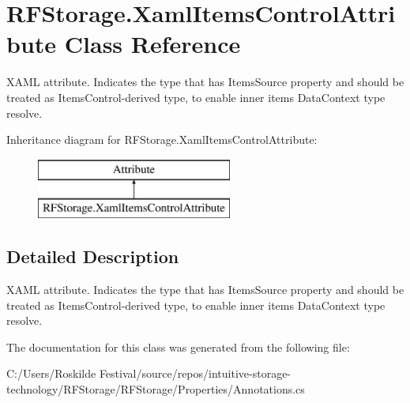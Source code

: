 \section{R\+F\+Storage.\+Xaml\+Items\+Control\+Attribute Class Reference}
\label{class_r_f_storage_1_1_xaml_items_control_attribute}


X\+A\+ML attribute. Indicates the type that has {\ttfamily Items\+Source} property and should be treated as {\ttfamily Items\+Control}-\/derived type, to enable inner items {\ttfamily Data\+Context} type resolve.  


Inheritance diagram for R\+F\+Storage.\+Xaml\+Items\+Control\+Attribute\+:\begin{figure}[H]
\begin{center}
\leavevmode
\includegraphics[height=2.000000cm]{class_r_f_storage_1_1_xaml_items_control_attribute}
\end{center}
\end{figure}


\subsection{Detailed Description}
X\+A\+ML attribute. Indicates the type that has {\ttfamily Items\+Source} property and should be treated as {\ttfamily Items\+Control}-\/derived type, to enable inner items {\ttfamily Data\+Context} type resolve. 



The documentation for this class was generated from the following file\+:\begin{DoxyCompactItemize}
\item 
C\+:/\+Users/\+Roskilde Festival/source/repos/intuitive-\/storage-\/technology/\+R\+F\+Storage/\+R\+F\+Storage/\+Properties/Annotations.\+cs\end{DoxyCompactItemize}
